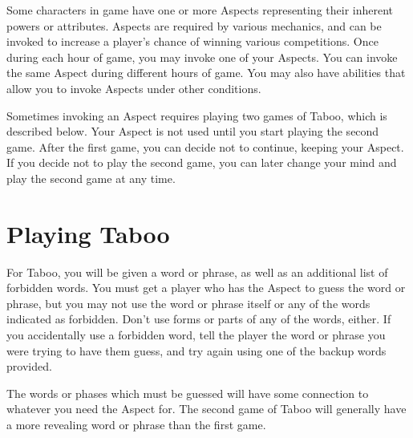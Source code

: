 \documentclass[green]{guardians}
\begin{document}
\name{\gAspect{}}

Some characters in game have one or more Aspects representing their inherent powers or attributes. Aspects are required by various mechanics, and can be invoked to increase a player's chance of winning various competitions. Once during each hour of game, you may invoke one of your Aspects. You can invoke the same Aspect during different hours of game. You may also have abilities that allow you to invoke Aspects under other conditions.

Sometimes invoking an Aspect requires playing two games of Taboo, which is described below. Your Aspect is not used until you start playing the second game. After the first game, you can decide not to continue, keeping your Aspect. If you decide not to play the second game, you can later change your mind and play the second game at any time.


\section*{Playing Taboo}

For Taboo, you will be given a word or phrase, as well as an additional list of forbidden words. You must get a player who has the Aspect to guess the word or phrase, but you may not use the word or phrase itself or any of the words indicated as forbidden. Don't use forms or parts of any of the words, either. If you accidentally use a forbidden word, tell the player the word or phrase you were trying to have them guess, and try again using one of the backup words provided.

The words or phases which must be guessed will have some connection to whatever you need the Aspect for. The second game of Taboo will generally have a more revealing word or phrase than the first game.
\end{document}
